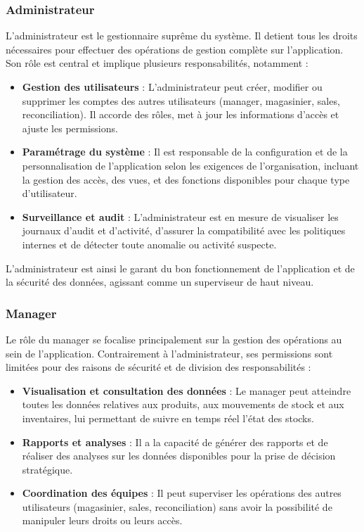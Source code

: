 \documentclass[a4paper, oneside, 12pt, final]{extreport}
\begin{document}
\subsubsection{Administrateur}

L'administrateur est le gestionnaire suprême du système. Il detient tous les droits nécessaires pour effectuer des opérations de gestion complète sur l'application. Son rôle est central et implique plusieurs responsabilités, notamment :

\begin{itemize}
    \item \textbf{Gestion des utilisateurs} : L'administrateur peut créer, modifier ou supprimer les comptes des autres utilisateurs (manager, magasinier, sales, reconciliation). Il accorde des rôles, met à jour les informations d'accès et ajuste les permissions.
    \item \textbf{Paramétrage du système} : Il est responsable de la configuration et de la personnalisation de l'application selon les exigences de l'organisation, incluant la gestion des accès, des vues, et des fonctions disponibles pour chaque type d'utilisateur.
    \item \textbf{Surveillance et audit} : L'administrateur est en mesure de visualiser les journaux d'audit et d'activité, d'assurer la compatibilité avec les politiques internes et de détecter toute anomalie ou activité suspecte.
\end{itemize}

L'administrateur est ainsi le garant du bon fonctionnement de l'application et de la sécurité des données, agissant comme un superviseur de haut niveau.

\subsubsection{Manager}

Le rôle du manager se focalise principalement sur la gestion des opérations au sein de l'application. Contrairement à l'administrateur, ses permissions sont limitées pour des raisons de sécurité et de division des responsabilités :

\begin{itemize}
    \item \textbf{Visualisation et consultation des données} : Le manager peut atteindre toutes les données relatives aux produits, aux mouvements de stock et aux inventaires, lui permettant de suivre en temps réel l'état des stocks.
    \item \textbf{Rapports et analyses} : Il a la capacité de générer des rapports et de réaliser des analyses sur les données disponibles pour la prise de décision stratégique.
    \item \textbf{Coordination des équipes} : Il peut superviser les opérations des autres utilisateurs (magasinier, sales, reconciliation) sans avoir la possibilité de manipuler leurs droits ou leurs accès.
\end{itemize}
\end{document}
